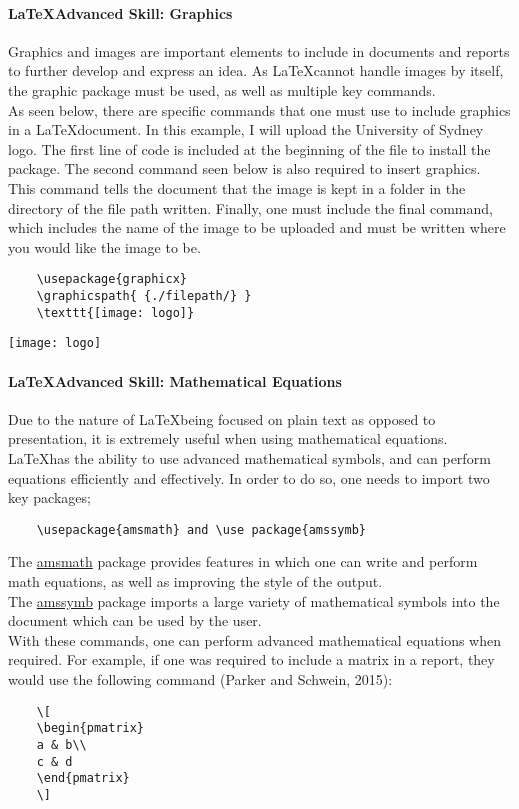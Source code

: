 \documentclass[a4paper, 11pt]{report}
\begin{document}
    
    
    \paragraph{\LaTeX \space Advanced Skill: Graphics} Graphics and images are important elements to include in documents and reports to further develop and express an idea. As \LaTeX \space cannot handle images by itself, the graphic package must be used, as well as multiple key commands.
    \\
    As seen below, there are specific commands that one must use to include graphics in a \LaTeX \space document. In this example, I will upload the University of Sydney logo. The first line of code is included at the beginning of the file to install the package. The second command seen below is also required to insert graphics. This command tells the document that the image is kept in a folder in the directory of the file path written. Finally, one must include the final command, which includes the name of the image to be uploaded and must be written where you would like the image to be.

    \begin{verbatim}
    \usepackage{graphicx}
    \graphicspath{ {./filepath/} } 
    \texttt{[image: logo]}
    \end{verbatim}
    

    \begin{center}
    \texttt{[image: logo]}
    \end{center}
    
    \paragraph{\LaTeX \space Advanced Skill: Mathematical Equations} Due to the nature of \LaTeX \space being focused on plain text as opposed to presentation, it is extremely useful when using mathematical equations. \LaTeX \space has the ability to use advanced mathematical symbols, and can perform equations efficiently and effectively. In order to do so, one needs to import two key packages;
    \begin{verbatim}
    \usepackage{amsmath} and \use package{amssymb}
    \end{verbatim}  
    The \underline{amsmath} package provides features in which one can write and perform math equations, as well as improving the style of the output.
    \\
    The \underline{amssymb} package imports a large variety of mathematical symbols into the document which can be used by the user. 
    \\
    \noindent
    With these commands, one can perform advanced mathematical equations when required. For example, if one was required to include a matrix in a report, they would use the following command (Parker and Schwein, 2015):
    \begin{verbatim}
    \[
    \begin{pmatrix}
    a & b\\
    c & d
    \end{pmatrix}
    \]
    \end{verbatim}  
    
\end{document}
